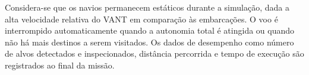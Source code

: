 Considera-se que os navios permanecem estáticos durante a simulação, dada a alta velocidade relativa do VANT em comparação às embarcações. O voo é interrompido automaticamente quando a autonomia total é atingida ou quando não há mais destinos a serem visitados. Os dados de desempenho como número de alvos detectados e inspecionados, distância percorrida e tempo de execução são registrados ao final da missão.



